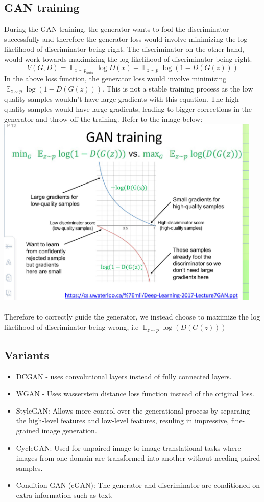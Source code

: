 \documentclass{article}
\newcommand{\E}{\mathop{\mathbb{E}}}
\begin{document}
\subsection{GAN training}
During the GAN training, the generator wants to fool the discriminator successfully and therefore the generator loss
would involve minimizing the log likelihood of discriminator being right. The discriminator on the other hand,
would work towards maximizing the log likelihood of discriminator being right.\\
$$V(G, D) = \E_{x \sim p_{data}} \mathop{log} D(x) + \E_{z \sim p} \mathop{log} (1 - D(G(z)))$$
In the above loss function, the generator loss would involve minimizing $\E_{z \sim p} \mathop{log} (1 - D(G(z)))$.
This is not a stable training process as the low quality samples wouldn't have large gradients with this equation.
The high quality samples would have large gradients, leading to bigger corrections in the generator and throw off the training.
Refer to the image below:\\
\includegraphics[width=5in]{./imgs/gan-training.jpg}\\\\
Therefore to correctly guide the generator, we instead choose to maximize the log likelihood of discriminator being wrong,
i.e $\E_{z \sim p} \mathop{log} (D(G(z)))$

\subsection{Variants}
\begin{itemize}
	\item DCGAN - uses convolutional layers instead of fully connected layers.
	\item WGAN - Uses wasserstein distance loss function instead of the original loss.
	\item StyleGAN: Allows more control over the generational process by separaing the high-level features and low-level features,
	resuling in impressive, fine-grained image generation.
	\item CycleGAN: Used for unpaired image-to-image translational tasks where images from one domain are transformed into another
	without needing paired samples.
	\item Condition GAN (cGAN): The generator and discriminator are conditioned on extra information such as text.
\end{itemize}
\end{document}
